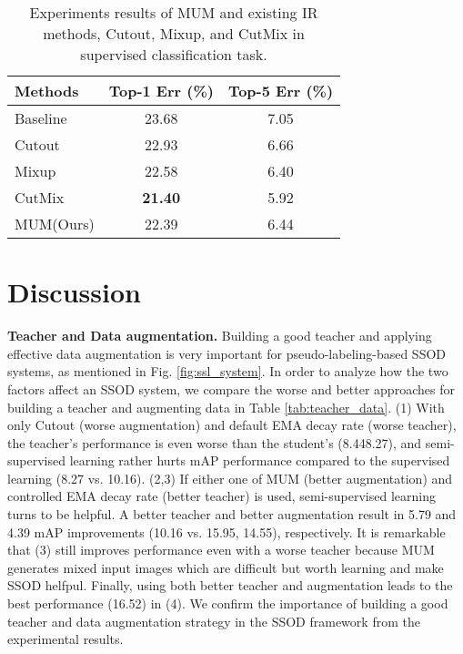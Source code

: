\documentclass[10pt,twocolumn,letterpaper]{article}
\begin{document}
\begin{table}[]
\caption{Experiments results of MUM and existing IR methods, Cutout\cite{devries2017cutout}, Mixup\cite{zhang2017mixup}, and CutMix\cite{cutmix} in supervised classification task.}
\vspace{-1mm}
\centering
{}
{
\begin{tabular}{|l|cc|}
\hline
Methods   & Top-1 Err (\%) & Top-5 Err (\%) \\ \hline
Baseline  & 23.68          & 7.05           \\
Cutout\cite{devries2017cutout}    & 22.93          & 6.66           \\
Mixup\cite{zhang2017mixup}     & 22.58          & 6.40           \\
CutMix\cite{cutmix}    & \textbf{21.40} & 5.92           \\
MUM(Ours) & \color{blue}22.39 & 6.44           \\ \hline
\end{tabular}
}
\label{tab:classification}
\vspace{-1mm}
\end{table}


\section{Discussion}
\label{sec:discussions}
\noindent\textbf{Teacher and Data augmentation.} 
Building a good teacher and applying effective data augmentation is very important for pseudo-labeling-based SSOD systems, as mentioned in Fig. \ref{fig:ssl_system}.
In order to analyze how the two factors affect an SSOD system, we compare the worse and better approaches for building a teacher and augmenting data in Table \ref{tab:teacher_data}.
(1) With only Cutout (worse augmentation) and default EMA decay rate (worse teacher), the teacher's performance is even worse than the student's (8.448.27), and semi-supervised learning rather hurts mAP performance compared to the supervised learning (8.27 vs. 10.16).
(2,3) If either one of MUM (better augmentation) and controlled EMA decay rate (better teacher) is used, semi-supervised learning turns to be helpful.
A better teacher and better augmentation result in 5.79 and 4.39 mAP improvements (10.16 vs. 15.95, 14.55), respectively. 
It is remarkable that (3) still improves performance even with a worse teacher because MUM generates mixed input images which are difficult but worth learning and make SSOD helfpul. 
Finally, using both better teacher and augmentation leads to the best performance (16.52) in (4).
We confirm the importance of building a good teacher and data augmentation strategy in the SSOD framework from the experimental results.
\end{document}
